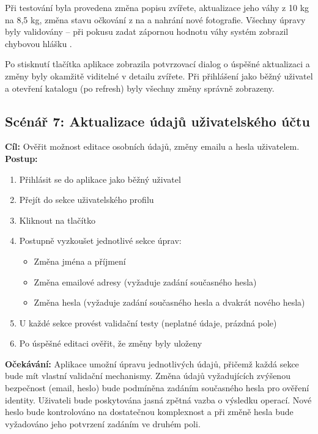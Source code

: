 \documentclass[czech, bp, kiv, he, iso690numb, pdf]{fasthesis}
\begin{document}
    Při testování byla provedena změna popisu zvířete, aktualizace jeho váhy z 10 kg na 8,5 kg, změna stavu očkování z  na  a nahrání nové fotografie. Všechny úpravy byly validovány – při pokusu zadat zápornou hodnotu váhy systém zobrazil chybovou hlášku .

    Po stisknutí tlačítka  aplikace zobrazila potvrzovací dialog o úspěšné aktualizaci a změny byly okamžitě viditelné v detailu zvířete. Při přihlášení jako běžný uživatel a otevření katalogu (po refresh) byly všechny změny správně zobrazeny.



    \subsection*{Scénář 7: Aktualizace údajů uživatelského účtu}

    \textbf{Cíl:} Ověřit možnost editace osobních údajů, změny emailu a hesla uživatelem.\\

    \noindent \textbf{Postup:}
    \begin{enumerate}
        \item Přihlásit se do aplikace jako běžný uživatel
        \item Přejít do sekce uživatelského profilu
        \item Kliknout na tlačítko 
        \item Postupně vyzkoušet jednotlivé sekce úprav:
        \begin{itemize}
            \item Změna jména a příjmení
            \item Změna emailové adresy (vyžaduje zadání současného hesla)
            \item Změna hesla (vyžaduje zadání současného hesla a dvakrát nového hesla)
        \end{itemize}
        \item U každé sekce provést validační testy (neplatné údaje, prázdná pole)
        \item Po úspěšné editaci ověřit, že změny byly uloženy
    \end{enumerate}

    \noindent \textbf{Očekávání:}
    Aplikace umožní úpravu jednotlivých údajů, přičemž každá sekce bude mít vlastní validační mechanismy. Změna údajů vyžadujících zvýšenou bezpečnost (email, heslo) bude podmíněna zadáním současného hesla pro ověření identity. Uživateli bude poskytována jasná zpětná vazba o výsledku operací. Nové heslo bude kontrolováno na dostatečnou komplexnost a při změně hesla bude vyžadováno jeho potvrzení zadáním ve druhém poli.\\
\end{document}
